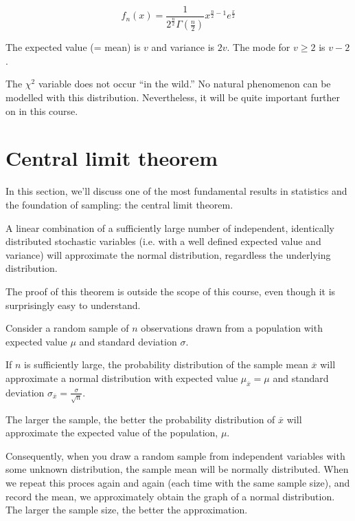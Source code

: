 \[ f_{n}(x) = \frac{1}{2^{\frac{n}{2}}\Gamma(\frac{n}{2})} x^{\frac{n}{2} -1} e^{\frac{x}{2}} \]

The expected value (= mean) is $v$ and variance is $2v$. The mode for $v \geq 2$ is $v-2$.

The $\chi^{2}$ variable does not occur ``in the wild.'' No natural phenomenon can be modelled with this distribution. Nevertheless, it will be quite important further on in this course.

\section{Central limit theorem}
\label{sec:central-limit-theorem}

In this section, we'll discuss one of the most fundamental results in statistics and the foundation of sampling: the central limit theorem.

\begin{theorem}
  A linear combination of a sufficiently large number of independent, identically distributed stochastic variables (i.e. with a well defined expected value and variance) will approximate the normal distribution, regardless the underlying distribution.
\end{theorem}

The proof of this theorem is outside the scope of this course, even though it is surprisingly easy to understand.

\begin{theorem}
  Consider a random sample of $n$ observations drawn from a population with expected value $\mu$ and standard deviation $\sigma$.
  
  If $n$ is sufficiently large, the probability distribution of the sample mean $\overline{x}$ will approximate a normal distribution with expected value $\mu_{\overline{x}} = \mu$ and standard deviation $\sigma_{\overline{x}} = \frac{\sigma}{\sqrt{n}}$.
  
  The larger the sample, the better the probability distribution of $\overline{x}$ will approximate the expected value of the population, $\mu$.
\end{theorem}

Consequently, when you draw a random sample from independent variables with some unknown distribution, the sample mean will be normally distributed. When we repeat this proces again and again (each time with the same sample size), and record the mean, we approximately obtain the graph of a normal distribution. The larger the sample size, the better the approximation.

